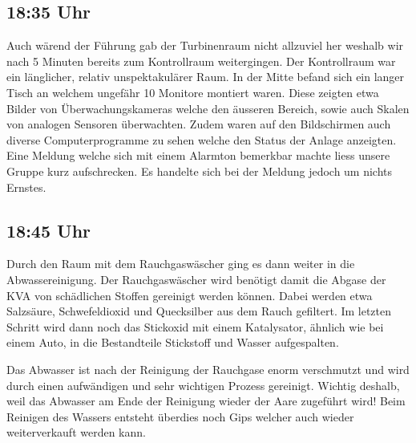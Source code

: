 \subsection{18:35 Uhr}
\label{sec-2-9}
Auch wärend der Führung gab der Turbinenraum nicht allzuviel her
weshalb wir nach 5 Minuten bereits zum Kontrollraum weitergingen.  Der
Kontrollraum war ein länglicher, relativ unspektakulärer Raum. In der
Mitte befand sich ein langer Tisch an welchem ungefähr 10 Monitore
montiert waren. Diese zeigten etwa Bilder von Überwachungskameras
welche den äusseren Bereich, sowie auch Skalen von analogen Sensoren
überwachten.  Zudem waren auf den Bildschirmen auch diverse
Computerprogramme zu sehen welche den Status der Anlage
anzeigten. Eine Meldung welche sich mit einem Alarmton bemerkbar
machte liess unsere Gruppe kurz aufschrecken. Es handelte sich bei der
Meldung jedoch um nichts Ernstes.

\begin{center}
\end{center}

\subsection{18:45 Uhr}
\label{sec-2-10}
Durch den Raum mit dem Rauchgaswäscher ging es dann weiter in die
Abwassereinigung. Der Rauchgaswäscher wird benötigt damit die Abgase
der KVA von schädlichen Stoffen gereinigt werden können.  Dabei werden
etwa Salzsäure, Schwefeldioxid und Quecksilber aus dem Rauch
gefiltert. Im letzten Schritt wird dann noch das Stickoxid mit einem
Katalysator, ähnlich wie bei einem Auto, in die Bestandteile
Stickstoff und Wasser aufgespalten.

Das Abwasser ist nach der Reinigung der Rauchgase enorm verschmutzt
und wird durch einen aufwändigen und sehr wichtigen Prozess gereinigt. 
Wichtig deshalb, weil das Abwasser am Ende der Reinigung wieder der
Aare zugeführt wird! Beim Reinigen des Wassers entsteht überdies
noch Gips welcher auch wieder weiterverkauft werden kann.

